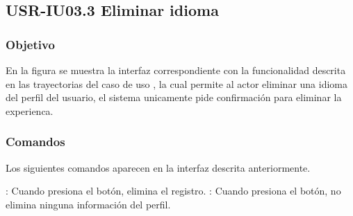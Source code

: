 \clearpage
\subsection{USR-IU03.3 Eliminar idioma}

\subsubsection{Objetivo}
En la figura  se muestra la interfaz correspondiente con la funcionalidad descrita en las
trayectorias del caso de uso  , la cual permite al actor eliminar una idioma del perfil del usuario, el sistema unicamente pide confirmación para eliminar la experienca.

\subsubsection{Comandos}
Los siguientes comandos aparecen en la interfaz descrita anteriormente.

\Titem {} : Cuando presiona el botón, elimina el registro.
\Titem {} : Cuando presiona el botón, no elimina ninguna información del perfil.%



\clearpage

